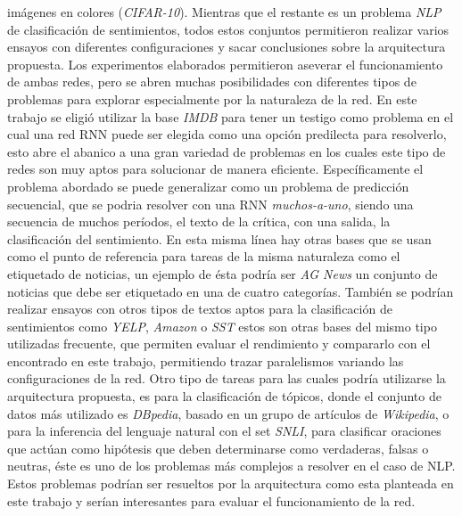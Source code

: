 \documentclass[spanish]{article}
\theoremstyle{definition}
\theoremstyle{remark}
\numberwithin{equation}{section}
\numberwithin{equation}{section} %
\begin{document}
imágenes en colores (\textit{CIFAR-10}). Mientras que el restante es un problema \textit{NLP} de clasificación de sentimientos, todos estos conjuntos permitieron realizar varios ensayos con diferentes configuraciones y sacar conclusiones sobre la arquitectura propuesta. Los experimentos elaborados permitieron aseverar el funcionamiento de ambas redes, pero se abren muchas posibilidades con diferentes tipos de problemas para explorar especialmente por la naturaleza de la red. En este trabajo se eligió utilizar la base \textit{IMDB} para tener un testigo como problema en el cual una red RNN puede ser elegida como una opción predilecta para resolverlo, esto abre el abanico a una gran variedad de problemas en los cuales este tipo de redes son muy aptos para solucionar de manera eficiente. Específicamente el problema abordado se puede generalizar como un problema de predicción secuencial, que se podria resolver con una RNN \textit{muchos-a-uno}, siendo una secuencia de muchos períodos, el texto de la crítica, con una salida, la clasificación del sentimiento. En esta misma línea hay otras bases que se usan como el punto de referencia para tareas de la misma naturaleza como el etiquetado de noticias, un ejemplo de ésta podría ser \textit{AG News}\cite{minaee2020deep} un conjunto de noticias que debe ser etiquetado en una de cuatro categorías. También se podrían realizar ensayos con otros tipos de textos aptos para la clasificación de sentimientos como \textit{YELP}, \textit{Amazon} o \textit{SST} estos son otras bases del mismo tipo utilizadas frecuente, que permiten evaluar el rendimiento y compararlo con el encontrado en este trabajo, permitiendo trazar paralelismos variando las configuraciones de la red. Otro tipo de tareas para las cuales podría utilizarse la arquitectura propuesta, es para la clasificación de tópicos, donde el conjunto de datos más utilizado es \textit{DBpedia}, basado en un grupo de artículos de \textit{Wikipedia}, o para la inferencia del lenguaje natural con el set \textit{SNLI}, para clasificar oraciones que actúan como hipótesis que deben determinarse como verdaderas, falsas o neutras, éste es uno de los problemas más complejos a resolver en el caso de NLP. Estos problemas podrían ser resueltos por la arquitectura como esta planteada en este trabajo y serían interesantes para evaluar el funcionamiento de la red.   
\par
\end{document}
